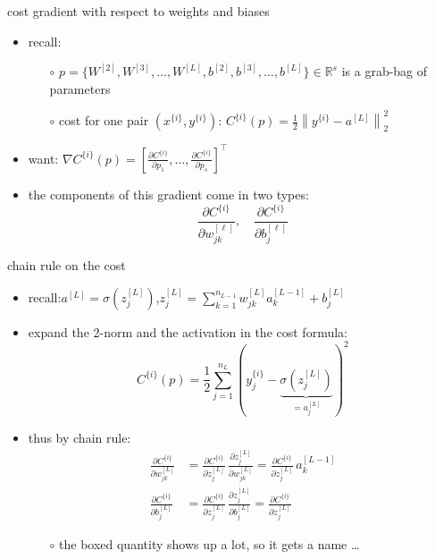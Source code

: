 \documentclass[xcolor={svgnames},
               hyperref={colorlinks,citecolor=DeepPink4,linkcolor=FireBrick,urlcolor=Maroon}]
               {beamer}
\newcommand{\grad}{\nabla}
\newcommand{\RR}{\mathbb{R}}
\begin{document}
\begin{frame}{cost gradient with respect to weights and biases}

\begin{itemize}
\item recall:
    \begin{itemize}
    \item[$\circ$] $p = \{W^{[2]},W^{[3]},\dots,W^{[L]},b^{[2]},b^{[3]},\dots,b^{[L]}\} \in \RR^s$ is a grab-bag of parameters
    \item[$\circ$] cost for one pair $(x^{\{i\}},y^{\{i\}})$:  \qquad \small $\displaystyle C^{\{i\}}(p) = \frac{1}{2} \left\|y^{\{i\}} - a^{[L]}\right\|_2^2$ \normalsize
    \end{itemize}

\medskip
\item want: \qquad \small  $\displaystyle \grad C^{\{i\}}(p) = \left[\frac{\partial C^{\{i\}}}{\partial p_1},\dots,\frac{\partial C^{\{i\}}}{\partial p_s}\right]^\top$ \normalsize
\item the components of this gradient come in two types:
    $$\frac{\partial C^{\{i\}}}{\partial w_{jk}^{[\ell]}}, \quad \frac{\partial C^{\{i\}}}{\partial b_j^{[\ell]}}$$
\end{itemize}
\end{frame}


\begin{frame}{chain rule on the cost}

\begin{itemize}
\item recall:\quad $a^{[L]} = \sigma(z_j^{[L]})$,\quad $\displaystyle z_j^{[L]} = \sum_{k=1}^{n_{L-1}} w_{jk}^{[L]} a_k^{[L-1]} + b_j^{[L]}$
\item expand the 2-norm and the activation in the cost formula:
    $$C^{\{i\}}(p) = \frac{1}{2} \sum_{j=1}^{n_L} (y_j^{\{i\}} - \underbrace{\sigma(z_j^{[L]})}_{= a_j^{[L]}})^2$$

\vspace{-4mm}
\item thus by chain rule:
\begin{align*}
\frac{\partial C^{\{i\}}}{\partial w_{jk}^{[L]}} &= \boxed{\frac{\partial C^{\{i\}}}{\partial z_j^{[L]}}}\, \frac{\partial z_j^{[L]}}{\partial w_{jk}^{[L]}} = \boxed{\frac{\partial C^{\{i\}}}{\partial z_j^{[L]}}}\, a_k^{[L-1]} \\
\frac{\partial C^{\{i\}}}{\partial b_{j}^{[L]}} &= \boxed{\frac{\partial C^{\{i\}}}{\partial z_j^{[L]}}}\, \frac{\partial z_j^{[L]}}{\partial b_{j}^{[L]}} = \boxed{\frac{\partial C^{\{i\}}}{\partial z_j^{[L]}}}
\end{align*}
    \begin{itemize}
    \item[$\circ$] the boxed quantity shows up a lot, so it gets a name \dots
    \end{itemize}
\end{itemize}
\end{frame}
\end{document}
